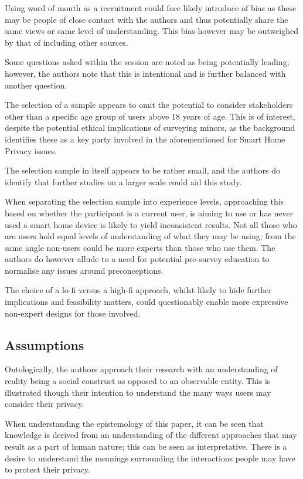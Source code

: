 Using word of mouth as a recruitment could face likely introduce of bias as these may be people of close contact with the authors and thus potentially share the same views or same level of understanding. This bias however may be outweighed by that of including other sources.

Some questions asked within the session are noted as being potentially leading; however, the authors note that this is intentional and is further balanced with another question.

The selection of a sample appears to omit the potential to consider stakeholders other than a specific age group of users above 18 years of age. This is of interest, despite the potential ethical implications of surveying minors, as the background identifies these as a key party involved in the aforementioned for Smart Home Privacy issues.

The selection sample in itself appears to be rather small, and the authors do identify that further studies on a larger scale could aid this study.

When separating the selection sample into experience levels, approaching this based on whether the participant is a current user, is aiming to use or has never used a smart home device is likely to yield inconsistent results. Not all those who are users hold equal levels of understanding of what they may be using; from the same angle non-users could be more experts than those who use them. The authors do however allude to a need for potential pre-survey education to normalise any issues around preconceptions.

The choice of a lo-fi versus a high-fi approach, whilst likely to hide further implications and feasibility matters, could questionably enable more expressive non-expert designs for those involved.

\subsection{Assumptions}

Ontologically, the authors approach their research with an understanding of reality being a social construct as opposed to an observable entity. This is illustrated though their intention to understand the many ways users may consider their privacy.

When understanding the epistemology of this paper, it can be seen that knowledge is derived from an understanding of the different approaches that may result as a part of human nature; this can be seen as interpretative. There is a desire to understand the meanings surrounding the interactions people may have to protect their privacy. 

